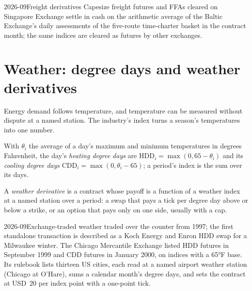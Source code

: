 \begin{dated}{2026-09}{Freight derivatives}\label{dat:m3:freight-weather-and-other-corners:ffa}
Capesize freight futures and FFAs cleared on Singapore Exchange settle in cash on the arithmetic
average of the Baltic Exchange's daily assessments of the five-route time-charter basket in the
contract month; the same indices are cleared as futures by other exchanges.
\end{dated}

\section{Weather: degree days and weather derivatives}

Energy demand follows temperature, and temperature can be measured without dispute at a named
station. The industry's index turns a season's temperatures into one number.

\begin{definition}\label{def:m3:freight-weather-and-other-corners:dd}
With $\theta_i$ the average of a day's maximum and minimum temperatures in degrees Fahrenheit, the
day's \emph{heating degree days} are $\mathrm{HDD}_i = \max(0, 65 - \theta_i)$
and its \emph{cooling degree days} $\mathrm{CDD}_i = \max(0, \theta_i - 65)$;
a period's index is the sum over its days.
\end{definition}

\begin{definition}\label{def:m3:freight-weather-and-other-corners:wd}
A \emph{weather derivative} is a contract whose payoff is a function of a
weather index at a named station over a period: a swap that pays a tick per degree day above or below
a strike, or an option that pays only on one side, usually with a cap.
\end{definition}

\begin{dated}{2026-09}{Exchange-traded weather}\label{dat:m3:freight-weather-and-other-corners:cme}
 traded over the counter from 1997; the first standalone transaction is described
as a Koch Energy and Enron HDD swap for a Milwaukee winter. The Chicago Mercantile Exchange listed HDD
futures in September 1999 and CDD futures in January 2000, on indices with a 65°F base. Its rulebook lists thirteen
US cities, each read at a named airport weather station (Chicago at O'Hare), sums a calendar month's degree days, and
sets the contract at USD~20 per index point with a one-point tick.
\end{dated}

